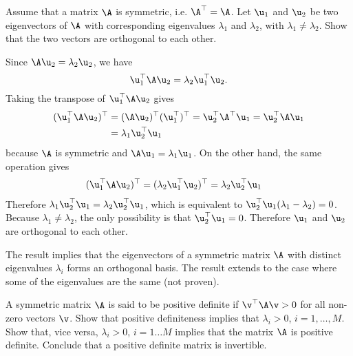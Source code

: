 
\label{ex:eigenvalue-decomposition-symmetric-matrices}
\begin{exenumerate}
\item Assume that a matrix $\A$ is symmetric, i.e. $\A^\top=\A$. Let $\u_1$ and
  $\u_2$ be two eigenvectors of $\A$ with corresponding eigenvalues $\lambda_1$
  and $\lambda_2$, with $\lambda_1 \neq \lambda_2$. Show that the two vectors
  are orthogonal to each other.

  \begin{solution}
    Since $\A\u_2 = \lambda_2\u_2$, we have
    \begin{equation}
      \u_1^\top \A\u_2 = \lambda_2\u_1^\top\u_2.
    \end{equation}
    Taking the transpose of $\u_1^\top \A\u_2$ gives
    \begin{align}
      (\u_1^\top \A\u_2)^\top &= (\A\u_2)^\top(\u_1^\top)^\top = \u_2^\top \A^\top \u_1 = \u_2^\top \A\u_1 \\
                              & = \lambda_1\u_2^\top\u_1
    \end{align}
    because $\A$ is symmetric and $\A \u_1 = \lambda_1 \u_1$. On the other hand, the same operation gives
    \begin{align}
      (\u_1^\top \A\u_2)^\top &= (\lambda_2\u_1^\top\u_2)^\top = \lambda_2\u_2^\top\u_1
    \end{align}
    Therefore $\lambda_1\u_2^\top\u_1 = \lambda_2\u_2^\top\u_1$, which is equivalent to $\u_2^\top\u_1(\lambda_1 - \lambda_2) = 0$. Because
    $\lambda_1 \neq \lambda_2$, the only possibility is that
    $\u_2^\top\u_1 = 0$. Therefore $\u_1$ and $\u_2$ are orthogonal to each other.

    The result implies that the eigenvectors of a symmetric matrix $\A$ with
    distinct eigenvalues $\lambda_i$ forms an orthogonal basis. The result
    extends to the case where some of the eigenvalues are the same (not proven).


  \end{solution}

\item A symmetric matrix $\A$ is said to be positive definite if $\v^\top\A\v>0$
  for all non-zero vectors $\v$. Show that positive definiteness implies that
  $\lambda_i>0$, $i=1,\ldots, M$. Show that, vice versa, $\lambda_i>0$,
  $i=1 \ldots M$ implies that the matrix $\A$ is positive definite. Conclude
  that a positive definite matrix is invertible.


\end{exenumerate}
